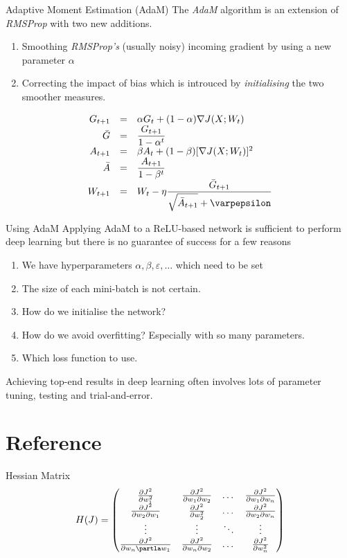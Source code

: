 \documentclass[11pt,a4paper]{article}
\begin{document}
\begin{proposition}{Adaptive Moment Estimation (AdaM)}
  The \textit{AdaM} algorithm is an extension of \textit{RMSProp} with two new additions.
  \begin{enumerate}
    \item Smoothing \textit{RMSProp's} (usually noisy) incoming gradient by using a new parameter $\alpha$
    \item Correcting the impact of bias which is introuced by \textit{initialising} the two smoother measures.
  \end{enumerate}
  \[\begin{array}{rcl}
    G_{t+1}&=&\alpha G_t+(1-\alpha)\nabla J(X;W_t)\\
    \bar{G}&=&\dfrac{G_{t+1}}{1-\alpha^t}\\
    A_{t+1}&=&\beta A_t+(1-\beta)[\nabla J(X;W_t)]^2\\
    \bar{A}&=&\dfrac{A_{t+1}}{1-\beta^t}\\
    W_{t+1}&=&W_t-\eta\dfrac{\bar{G}_{t+1}}{\sqrt{\bar{A}_{t+1}}+\varpepsilon}
  \end{array}\]
\end{proposition}

\begin{remark}{Using AdaM}
  Applying AdaM to a ReLU-based network is sufficient to perform deep learning but there is no guarantee of success for a few reasons
  \begin{enumerate}
    \item We have hyperparameters $\alpha,\beta,\varepsilon,\dots$ which need to be set
    \item The size of each mini-batch is not certain.
    \item How do we initialise the network?
    \item How do we avoid overfitting? Especially with so many parameters.
    \item Which loss function to use.
  \end{enumerate}
  Achieving top-end results in deep learning often involves lots of parameter tuning, testing and trial-and-error.
\end{remark}

\newpage
\setcounter{section}{-1}
\section{Reference}

\begin{definition}{Hessian Matrix}
  \[ H(J)=\begin{pmatrix}\frac{\partial J^2}{\partial w_1^2}&\frac{\partial J^2}{\partial w_1\partial w_2}&\dots&\frac{\partial J^2}{\partial w_1\partial w_n}\\\frac{\partial J^2}{\partial w_2\partial w_1}&\frac{\partial J^2}{\partial w_2^2}&\dots&\frac{\partial J^2}{\partial w_2\partial w_n}\\\vdots&\vdots&\ddots&\vdots\\\frac{\partial J^2}{\partial w_n\partla w_1}&\frac{\partial J^2}{\partial w_n\partial w_2}&\dots&\frac{\partial J^2}{\partial w_n^2}\end{pmatrix}\]
\end{definition}
\end{document}
